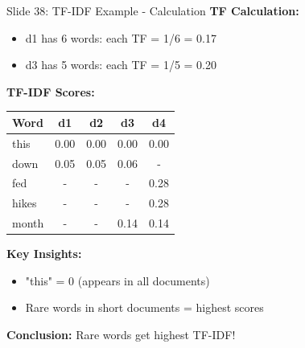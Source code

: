 \documentclass[8pt]{beamer}
\begin{document}
	\begin{frame}{Slide 38: TF-IDF Example - Calculation}
		\fontsize{6.5}{7.5}\selectfont
		\textbf{TF Calculation:}
		\begin{itemize}
			\item d1 has 6 words: each TF = 1/6 = 0.17
			\item d3 has 5 words: each TF = 1/5 = 0.20
		\end{itemize}
		
		\vspace{0.1cm}
		\textbf{TF-IDF Scores:}
		\begin{tabular}{|l|c|c|c|c|}
			\hline
			Word & d1 & d2 & d3 & d4 \\
			\hline
			this & 0.00 & 0.00 & 0.00 & 0.00 \\
			down & 0.05 & 0.05 & 0.06 & - \\
			fed & - & - & - & 0.28 \\
			hikes & - & - & - & 0.28 \\
			month & - & - & 0.14 & 0.14 \\
			\hline
		\end{tabular}
		
		\vspace{0.1cm}
		\textbf{Key Insights:}
		\begin{itemize}
			\item "this" = 0 (appears in all documents)
			\item Rare words in short documents = highest scores
		\end{itemize}
		
		\textcolor{myblue}{\textbf{Conclusion:}} Rare words get highest TF-IDF!
	\end{frame}
	
\end{document}
